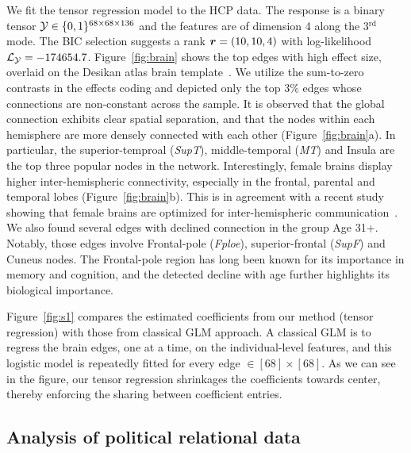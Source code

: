 \documentclass[12pt]{article}
\theoremstyle{plain}
\theoremstyle{definition}
\begin{document}
We fit the tensor regression model to the HCP data. The response is a binary tensor $\mathcal{Y}\in\{0,1\}^{68\times 68\times 136}$ and the features are of dimension 4 along the 3$^{\text{rd}}$ mode. The BIC selection suggests a rank $\bm{r}=(10,10,4)$ with log-likelihood $\mathcal{L}_{\mathcal{Y}}=-174654.7$. Figure~\ref{fig:brain} shows the top edges with high effect size, overlaid on the Desikan atlas brain template~\citep{desikan2006automated,xia2013brainnet}. We utilize the sum-to-zero contrasts in the effects coding and depicted only the top 3\% edges whose connections are non-constant across the sample. It is observed that the global connection exhibits clear spatial separation, and that the nodes within each hemisphere are more densely connected with each other (Figure~\ref{fig:brain}a). In particular, the superior-temproal (\emph{SupT}), middle-temporal (\emph{MT}) and Insula are the top three popular nodes in the network. Interestingly, female brains display higher inter-hemispheric connectivity, especially in the frontal, parental and temporal lobes (Figure~\ref{fig:brain}b). This is in agreement with a recent study showing that female brains are optimized for inter-hemispheric communication~\citep{ingalhalikar2014sex}. We also found several edges with declined connection in the group Age 31+. Notably, those edges involve Frontal-pole (\emph{Fploe}), superior-frontal (\emph{SupF}) and Cuneus nodes. The Frontal-pole region has long been known for its importance in memory and cognition, and the detected decline with age further highlights its biological importance. 

Figure~\ref{fig:s1} compares the estimated coefficients from our method (tensor regression) with those from classical GLM approach. A classical GLM is to regress the brain edges, one at a time, on the individual-level features, and this logistic model is repeatedly fitted for every edge $\in [68]\times [68]$. As we can see in the figure, our tensor regression shrinkages the coefficients towards center, thereby enforcing the sharing between coefficient entries. 


\subsection{Analysis of political relational data}
\end{document}
